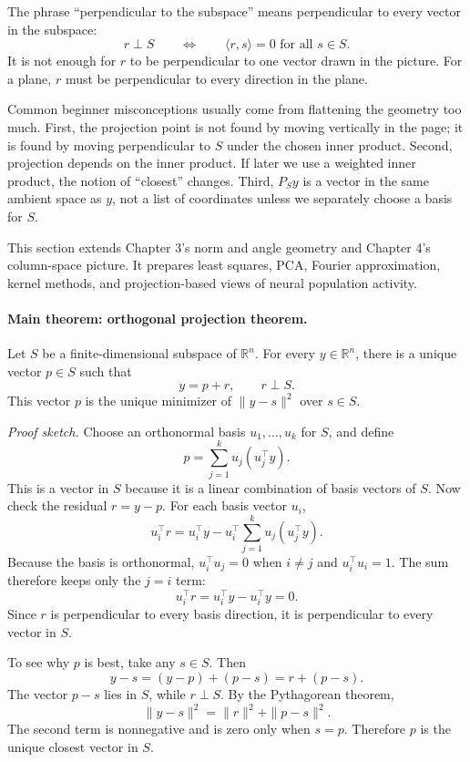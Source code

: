 The phrase ``perpendicular to the subspace'' means perpendicular to every vector in the subspace:
\[
r\perp S
\qquad\Longleftrightarrow\qquad
\langle r,s\rangle=0\text{ for all }s\in S.
\]
It is not enough for \(r\) to be perpendicular to one vector drawn in the picture. For a plane, \(r\) must be perpendicular to every direction in the plane.

Common beginner misconceptions usually come from flattening the geometry too much. First, the projection point is not found by moving vertically in the page; it is found by moving perpendicular to \(S\) under the chosen inner product. Second, projection depends on the inner product. If later we use a weighted inner product, the notion of ``closest'' changes. Third, \(P_Sy\) is a vector in the same ambient space as \(y\), not a list of coordinates unless we separately choose a basis for \(S\).

This section extends Chapter 3's norm and angle geometry and Chapter 4's column-space picture. It prepares least squares, PCA, Fourier approximation, kernel methods, and projection-based views of neural population activity.

\paragraph{Main theorem: orthogonal projection theorem.}
Let \(S\) be a finite-dimensional subspace of \(\mathbb{R}^n\). For every \(y\in\mathbb{R}^n\), there is a unique vector \(p\in S\) such that
\[
y=p+r,
\qquad
r\perp S.
\]
This vector \(p\) is the unique minimizer of \(\|y-s\|^2\) over \(s\in S\).

\emph{Proof sketch.} Choose an orthonormal basis \(u_1,\dots,u_k\) for \(S\), and define
\[
p=\sum_{j=1}^k u_j(u_j^\top y).
\]
This is a vector in \(S\) because it is a linear combination of basis vectors of \(S\). Now check the residual \(r=y-p\). For each basis vector \(u_i\),
\[
u_i^\top r
=u_i^\top y-u_i^\top\sum_{j=1}^k u_j(u_j^\top y).
\]
Because the basis is orthonormal, \(u_i^\top u_j=0\) when \(i\neq j\) and \(u_i^\top u_i=1\). The sum therefore keeps only the \(j=i\) term:
\[
u_i^\top r
=u_i^\top y-u_i^\top y=0.
\]
Since \(r\) is perpendicular to every basis direction, it is perpendicular to every vector in \(S\).

To see why \(p\) is best, take any \(s\in S\). Then
\[
y-s=(y-p)+(p-s)=r+(p-s).
\]
The vector \(p-s\) lies in \(S\), while \(r\perp S\). By the Pythagorean theorem,
\[
\|y-s\|^2=\|r\|^2+\|p-s\|^2.
\]
The second term is nonnegative and is zero only when \(s=p\). Therefore \(p\) is the unique closest vector in \(S\).

